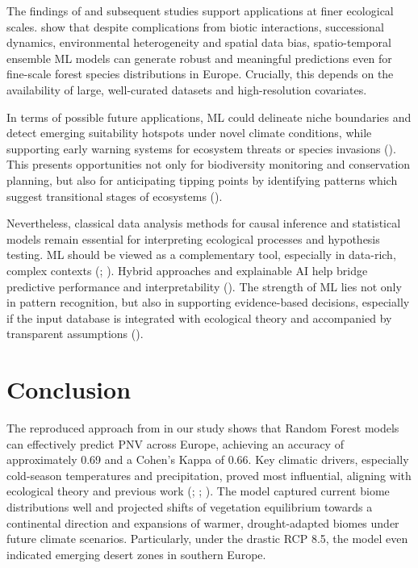 \documentclass[
]{krantz}
\begin{document}
The findings of \citet{hengl2018} and subsequent studies support applications at finer ecological scales. \citet{bonannella2022} show that despite complications from biotic interactions, successional dynamics, environmental heterogeneity and spatial data bias, spatio-temporal ensemble ML models can generate robust and meaningful predictions even for fine-scale forest species distributions in Europe. Crucially, this depends on the availability of large, well-curated datasets and high-resolution covariates.

In terms of possible future applications, ML could delineate niche boundaries and detect emerging suitability hotspots under novel climate conditions, while supporting early warning systems for ecosystem threats or species invasions (\citet{antonelli2023}). This presents opportunities not only for biodiversity monitoring and conservation planning, but also for anticipating tipping points by identifying patterns which suggest transitional stages of ecosystems (\citet{bury2021}).

Nevertheless, classical data analysis methods for causal inference and statistical models remain essential for interpreting ecological processes and hypothesis testing. ML should be viewed as a complementary tool, especially in data-rich, complex contexts (\citet{bonannella2022}; \citet{bonannella2023}). Hybrid approaches and explainable AI help bridge predictive performance and interpretability (\citet{pichler2023}). The strength of ML lies not only in pattern recognition, but also in supporting evidence-based decisions, especially if the input database is integrated with ecological theory and accompanied by transparent assumptions (\citet{yu2021}).

\section{Conclusion}\label{conclusion-1}

The reproduced approach from \citet{hengl2018} in our study shows that Random Forest models can effectively predict PNV across Europe, achieving an accuracy of approximately 0.69 and a Cohen's Kappa of 0.66. Key climatic drivers, especially cold-season temperatures and precipitation, proved most influential, aligning with ecological theory and previous work (\citet{bonannella2023}; \citet{holdridge1967}; \citet{koerner2016}). The model captured current biome distributions well and projected shifts of vegetation equilibrium towards a continental direction and expansions of warmer, drought-adapted biomes under future climate scenarios. Particularly, under the drastic RCP 8.5, the model even indicated emerging desert zones in southern Europe.
\end{document}
